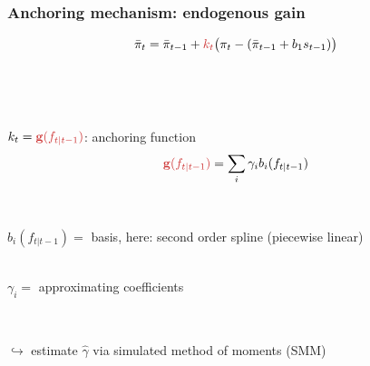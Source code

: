 \documentclass[10pt]{beamer}
\begin{document}
\begin{frame}
	\frametitle{Anchoring mechanism: endogenous gain}
	\label{anchoring1}


\begin{equation}
\bar{\pi}_{t}  =\bar{\pi}_{t-1} + \textcolor{brownreddark}{k_t}\big(\pi_{t} -(\bar{\pi}_{t-1}+b_1 s_{t-1}) \big)
\end{equation}

\

\

$k_t = \textcolor{brownreddark}{\mathbf{g}(f_{t|t-1})}$: anchoring function
\pause
\begin{equation}
 \textcolor{brownreddark}{\mathbf{g}(f_{t|t-1})} = \sum_i\gamma_i b_i(f_{t|t-1})\label{gain}
\end{equation}

\

$ b_i(f_{t|t-1}) = $ basis, here: second order spline (piecewise linear) \\

\

$\gamma_i  = $ approximating coefficients 

\

$ \hookrightarrow$ estimate $\hat{\gamma}$ via simulated method of moments (SMM)

\vfill 

\hfill \hyperlink{g}{}



\end{frame}
\end{document}
